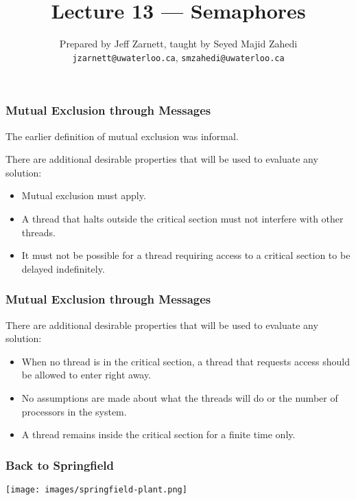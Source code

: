 

\title{Lecture 13 --- Semaphores }

\author{Prepared by Jeff Zarnett, taught by Seyed Majid Zahedi \\ \small \texttt{jzarnett@uwaterloo.ca}, \texttt{smzahedi@uwaterloo.ca}}
\date{}




\begin{frame}
	\titlepage

\end{frame}

\begin{frame}
	\frametitle{Mutual Exclusion through Messages}

	The earlier definition of mutual exclusion was informal.

	There are additional desirable properties that will be used to evaluate any solution:
	\begin{itemize}
		\item Mutual exclusion must apply.
		\item A thread that halts outside the critical section must not interfere with other threads.
		\item It must not be possible for a thread requiring access to a critical section to be delayed indefinitely.
	\end{itemize}
\end{frame}

\begin{frame}
	\frametitle{Mutual Exclusion through Messages}
	There are additional desirable properties that will be used to evaluate any solution:
	\begin{itemize}
		\item When no thread is in the critical section, a thread that requests access should be allowed to enter right away.
		\item No assumptions are made about what the threads will do or the number of processors in the system.
		\item A thread remains inside the critical section for a finite time only.
	\end{itemize}


\end{frame}


\begin{frame}
	\frametitle{Back to Springfield}

	\begin{center}
		\texttt{[image: images/springfield-plant.png]}
	\end{center}


\end{frame}


